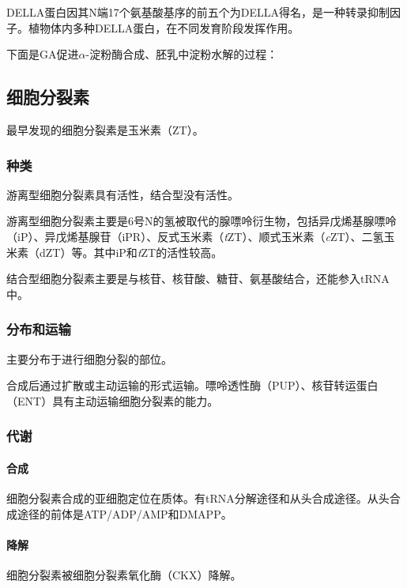 DELLA蛋白因其N端17个氨基酸基序的前五个为DELLA得名，是一种转录抑制因子。植物体内多种DELLA蛋白，在不同发育阶段发挥作用。

下面是GA促进$\alpha$-淀粉酶合成、胚乳中淀粉水解的过程：





\subsection{细胞分裂素}

最早发现的细胞分裂素是玉米素（ZT）。

\subsubsection{种类}

游离型细胞分裂素具有活性，结合型没有活性。

游离型细胞分裂素主要是6号N的氢被取代的腺嘌呤衍生物，包括异戊烯基腺嘌呤（iP）、异戊烯基腺苷（iPR）、反式玉米素（\textit{t}ZT）、顺式玉米素（\textit{c}ZT）、二氢玉米素（dZT）等。其中iP和\textit{t}ZT的活性较高。

结合型细胞分裂素主要是与核苷、核苷酸、糖苷、氨基酸结合，还能参入tRNA中。

\subsubsection{分布和运输}

主要分布于进行细胞分裂的部位。

合成后通过扩散或主动运输的形式运输。嘌呤透性酶（PUP）、核苷转运蛋白（ENT）具有主动运输细胞分裂素的能力。

\subsubsection{代谢}

\paragraph{合成}

细胞分裂素合成的亚细胞定位在质体。有tRNA分解途径和从头合成途径。从头合成途径的前体是ATP/ADP/AMP和DMAPP。

\paragraph{降解}

细胞分裂素被细胞分裂素氧化酶（CKX）降解。

